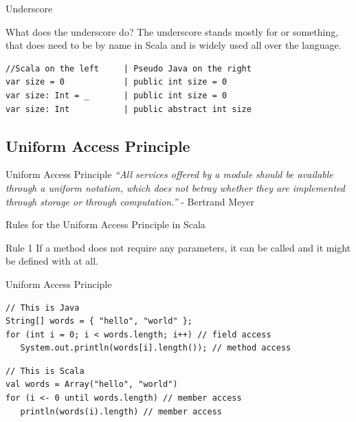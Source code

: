 \begin{frame}[fragile]{Underscore}
\begin{block}{What does the underscore do?}
The underscore stands mostly for  or something,
that does  need to be  by name in Scala
and is widely used all over the language.
\end{block}
\begin{lstlisting}
//Scala on the left     | Pseudo Java on the right
var size = 0            | public int size = 0
var size: Int = _       | public int size = 0
var size: Int           | public abstract int size
\end{lstlisting}
\end{frame}

\subsection{Uniform Access Principle}
\begin{frame}[fragile]{Uniform Access Principle}
\pause
\emph{``All services offered by a module should be available through a uniform
notation, which does not betray whether they are implemented through storage or
through computation.''} - Bertrand Meyer
\end{frame}

\begin{frame}[fragile]{Rules for the Uniform Access Principle in Scala}
\begin{block}{Rule 1}
If a method does not require any parameters, it can be called  and it might be defined with  at
all.
\end{block}
\pause
\begin{exampleblock}{Uniform Access Principle}
\begin{lstlisting}
// This is Java
String[] words = { "hello", "world" };
for (int i = 0; i < words.length; i++) // field access
   System.out.println(words[i].length()); // method access
\end{lstlisting}
\pause
\begin{lstlisting}
// This is Scala
val words = Array("hello", "world")
for (i <- 0 until words.length) // member access
   println(words(i).length) // member access
\end{lstlisting}
\end{exampleblock}
\end{frame}

